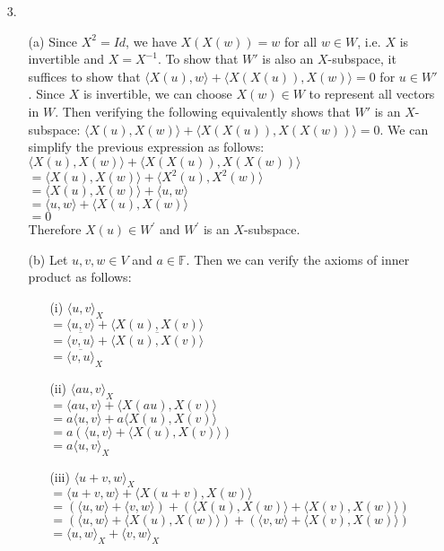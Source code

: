 \documentclass{article}
\begin{document}
\begin{itemize}
	\item [3.]
	      \begin{itemize}
			  \item [(a)] 
			  Since $X^2=Id$, we have $X(X(w))=w$ for all $w\in W$, i.e. $X$ is invertible and $X=X^{-1}$. To show that $W'$ is also an $X$-subspace, it suffices to show that $\langle X(u),w\rangle+\langle X(X(u)),X(w)\rangle=0$ for $u\in W'$. Since $X$ is invertible, we can choose $X(w)\in W$ to represent all vectors in $W$. Then verifying the following equivalently shows that $W'$ is an $X$-subspace: $\langle X(u),X(w)\rangle+\langle X(X(u)),X(X(w))\rangle=0$. We can simplify the previous expression as follows:
			  \\$\langle X(u),X(w)\rangle+\langle X(X(u)),X(X(w))\rangle$\\$=\langle X(u),X(w)\rangle+\langle X^2(u),X^2(w)\rangle$\\$=\langle X(u),X(w)\rangle+\langle u,w\rangle$\\$=\langle u,w\rangle+\langle X(u),X(w)\rangle$\\$=0$\\Therefore $X(u)\in W^\prime$ and $W^\prime$ is an $X$-subspace.
		      \item [(b)] Let $u,v,w\in V$ and $a\in\mathbb{F}$. Then we can verify the axioms of inner product as follows:
		            \begin{itemize}
			            \item [(i)] $\langle u,v\rangle_X$\\$=\langle u,v\rangle+\langle X(u),X(v)\rangle$\\$=\overline{\langle v,u\rangle}+\overline{\langle X(u),X(v)\rangle}$\\$=\overline{\langle v,u\rangle}_X$
			            \item [(ii)] $\langle au,v\rangle_X$\\$=\langle au,v\rangle+\langle X(au),X(v)\rangle$\\$=a\langle u,v\rangle+a\langle X(u),X(v)\rangle$\\$=a(\langle u,v\rangle+\langle X(u),X(v)\rangle)$\\$=a\langle u,v\rangle_X$
			            \item [(iii)] $\langle u+v,w\rangle_X$\\$=\langle u+v,w\rangle+\langle X(u+v),X(w)\rangle$\\$=(\langle u,w\rangle+\langle v,w\rangle)+(\langle X(u),X(w)\rangle+\langle X(v),X(w)\rangle)$\\$=(\langle u,w\rangle+\langle X(u),X(w)\rangle)+(\langle v,w\rangle+\langle X(v),X(w)\rangle)$\\$=\langle u,w\rangle_X+\langle v,w\rangle_X$

\end{itemize}
\end{itemize}
\end{itemize}
\end{document}
